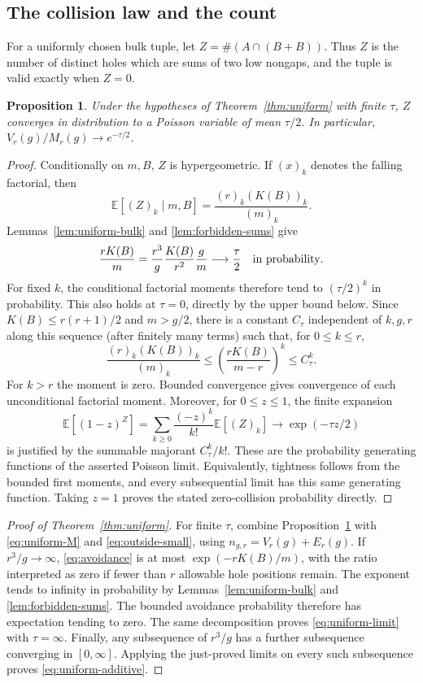 \documentclass[11pt]{article}
\newtheorem{proposition}[theorem]{Proposition}
\theoremstyle{remark}\newtheorem{remark}[theorem]{Remark}
\begin{document}
\subsection{The collision law and the count}

For a uniformly chosen bulk tuple, let
$Z=\#(A\cap(B+B))$. Thus $Z$ is the number of distinct holes which
are sums of two low nongaps, and the tuple is valid exactly when $Z=0$.

\begin{proposition}\label{prop:poisson}
Under the hypotheses of Theorem~\ref{thm:uniform} with finite $\tau$,
$Z$ converges in distribution to a Poisson variable of mean $\tau/2$.
In particular, $V_r(g)/M_r(g)\to e^{-\tau/2}$.
\end{proposition}

\begin{proof}
Conditionally on $m,B$, $Z$ is hypergeometric. If $(x)_k$ denotes the
falling factorial, then
\[
\mathbb E[(Z)_k\mid m,B]=\frac{(r)_k(K(B))_k}{(m)_k}.
\]
Lemmas~\ref{lem:uniform-bulk} and \ref{lem:forbidden-sums} give
\[
\frac{rK(B)}m
=\frac{r^3}{g}\frac{K(B)}{r^2}\frac gm
\longrightarrow\frac\tau2
\quad\hbox{in probability}.
\]
For fixed $k$, the conditional factorial moments therefore tend to
$(\tau/2)^k$ in probability. This also holds at $\tau=0$, directly
by the upper bound below. Since $K(B)\le r(r+1)/2$ and $m>g/2$,
there is a constant $C_\tau$ independent of $k,g,r$ along this sequence
(after finitely many terms) such that, for $0\le k\le r$,
\[
\frac{(r)_k(K(B))_k}{(m)_k}\le
\left(\frac{rK(B)}{m-r}\right)^k\le C_\tau^k.
\]
For $k>r$ the moment is zero. Bounded convergence gives convergence
of each unconditional factorial moment. Moreover, for $0\le z\le1$,
the finite expansion
\[
\mathbb E[(1-z)^Z]
=\sum_{k\ge0}\frac{(-z)^k}{k!}\mathbb E[(Z)_k]
\longrightarrow\exp(-\tau z/2)
\]
is justified by the summable majorant $C_\tau^k/k!$. These are the
probability generating functions of the asserted Poisson limit.
Equivalently, tightness follows from the bounded first moments, and
every subsequential limit has this same generating function. Taking
$z=1$ proves the stated zero-collision probability directly.
\end{proof}

\begin{proof}[Proof of Theorem~\ref{thm:uniform}]
For finite $\tau$, combine Proposition~\ref{prop:poisson} with
\eqref{eq:uniform-M} and \eqref{eq:outside-small}, using
$n_{g,r}=V_r(g)+E_r(g)$.
If $r^3/g\to\infty$, \eqref{eq:avoidance} is at most
$\exp(-rK(B)/m)$, with the ratio interpreted as zero if fewer than
$r$ allowable hole positions remain. The exponent tends to infinity
in probability by Lemmas~\ref{lem:uniform-bulk} and
\ref{lem:forbidden-sums}. The bounded avoidance probability therefore
has expectation tending to zero. The same decomposition proves
\eqref{eq:uniform-limit} with $\tau=\infty$.
Finally, any subsequence of $r^3/g$ has a further subsequence converging
in $[0,\infty]$. Applying the just-proved limits on every such
subsequence proves \eqref{eq:uniform-additive}.
\end{proof}
\end{document}
